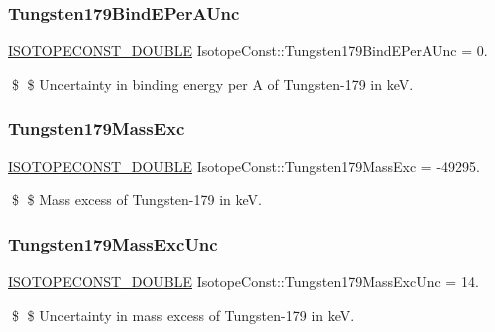 \subsubsection{\texorpdfstring{Tungsten179\+Bind\+E\+Per\+A\+Unc}{Tungsten179BindEPerAUnc}}
{\footnotesize\ttfamily \mbox{\hyperlink{group___isotope_const-_macros_ga8f45a7272ce02c0b4c65c44636ed719a}{I\+S\+O\+T\+O\+P\+E\+C\+O\+N\+S\+T\+\_\+\+D\+O\+U\+B\+LE}} Isotope\+Const\+::\+Tungsten179\+Bind\+E\+Per\+A\+Unc = 0.}

\$ \$ Uncertainty in binding energy per A of Tungsten-\/179 in keV. \mbox{\label{group___isotope_const-_tungsten-_w179_ga00e4fc9ed0d5128bcdb2ff82c2ed1f4b}} 
\subsubsection{\texorpdfstring{Tungsten179\+Mass\+Exc}{Tungsten179MassExc}}
{\footnotesize\ttfamily \mbox{\hyperlink{group___isotope_const-_macros_ga8f45a7272ce02c0b4c65c44636ed719a}{I\+S\+O\+T\+O\+P\+E\+C\+O\+N\+S\+T\+\_\+\+D\+O\+U\+B\+LE}} Isotope\+Const\+::\+Tungsten179\+Mass\+Exc = -\/49295.}

\$ \$ Mass excess of Tungsten-\/179 in keV. \mbox{\label{group___isotope_const-_tungsten-_w179_ga2ca4555968a3c64ad64ec2ed1534b6d9}} 
\subsubsection{\texorpdfstring{Tungsten179\+Mass\+Exc\+Unc}{Tungsten179MassExcUnc}}
{\footnotesize\ttfamily \mbox{\hyperlink{group___isotope_const-_macros_ga8f45a7272ce02c0b4c65c44636ed719a}{I\+S\+O\+T\+O\+P\+E\+C\+O\+N\+S\+T\+\_\+\+D\+O\+U\+B\+LE}} Isotope\+Const\+::\+Tungsten179\+Mass\+Exc\+Unc = 14.}

\$ \$ Uncertainty in mass excess of Tungsten-\/179 in keV. \mbox{\label{group___isotope_const-_tungsten-_w179_ga36669b1110fd91d6a70111f3350ff87a}} 
